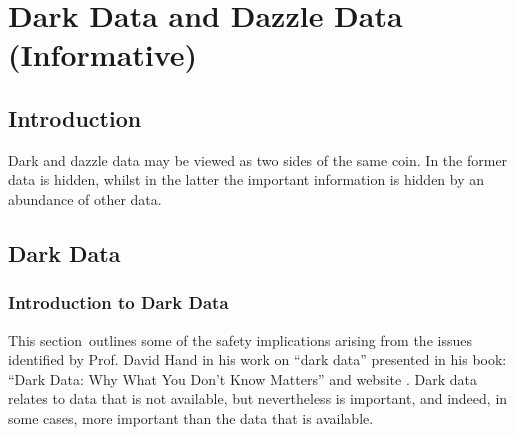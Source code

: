 %
%
\chapter{Dark Data and Dazzle Data (Informative)}%
\label{bkm:darkdazzledata}
%

\section{Introduction}
Dark and dazzle data may be viewed as two sides of the same coin. In the former data is hidden, whilst in the latter the important \gls{information} is hidden by an abundance of other data.

\section{Dark Data}%
%
\label{bkm:darkdata}
%
\subsection{Introduction to Dark Data}
This \cbstart section\cbend\ outlines some of the safety implications arising from the issues identified by Prof. David Hand in his work on ``dark data'' presented in his book: ``Dark Data: Why What You Don't Know Matters'' \cite{citation:darkdata:hand} and website \cite{citation:darkdata:website}. Dark data relates to data that is not available, but nevertheless is important, and indeed, in some cases, more important than the data that is available.

